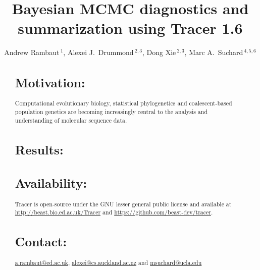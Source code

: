 \documentclass{bioinfo}
\begin{document}

\title[Tracer 1.6]{Bayesian MCMC diagnostics and summarization using Tracer 1.6}

\author[Rambaut \textit{et~al}]{ Andrew Rambaut\,$^{1}$, Alexei J.~Drummond\,$^{2,3}$, Dong Xie\,$^{2,3}$, Marc A.~Suchard\,$^{4,5,6}$}

\address{
$^{1}$Institute of Evolutionary Biology, University of Edinburgh, Edinburgh, UK\\
$^{2}$Department of Computer Science, University of Auckland, Auckland, NZ\\
$^{3}$Centre for Computational Evolution, University of Auckland, Auckland, NZ\\
$^{4,5}$Departments of Biomathematics and Human Genetics, David Geffen School of Medicine at UCLA, and \\
$^{6}$Department of Biostatistics, UCLA Fielding School of Public Health, University of California, Los Angeles, USA \\
}



\maketitle


\begin{abstract}

\section{Motivation:}
Computational evolutionary biology, statistical phylogenetics and coalescent-based population genetics are becoming increasingly central to the analysis and understanding of molecular sequence data. 
\section{Results:}

\section{Availability:}
Tracer is open-source under the GNU lesser general public license and available at 
\url{http://beast.bio.ed.ac.uk/Tracer} and \url{https://github.com/beast-dev/tracer}.

\section{Contact:} 
\href{a.rambaut@ed.ac.uk}{\url{a.rambaut@ed.ac.uk}}, 
\href{alexei@cs.auckland.ac.nz}{\url{alexei@cs.auckland.ac.nz}}
and 
\href{msuchard@ucla.edu}{\url{msuchard@ucla.edu}}

\end{abstract}
\end{document}
